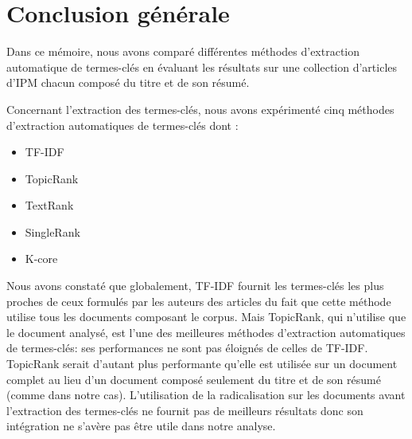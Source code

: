 \chapter*{Conclusion générale}

\qquad Dans ce mémoire, nous avons comparé différentes méthodes d'extraction automatique de termes-clés en évaluant les résultats sur une collection d'articles d'IPM chacun composé du titre et de son résumé.%

%

\smallskip

\qquad Concernant l'extraction des termes-clés, nous avons expérimenté cinq méthodes d'extraction automatiques de termes-clés dont : 
\begin{itemize}
	\item TF-IDF\cite{bougouin2013etat}
	\item TopicRank\cite{bougouin2013topicrank}
	\item TextRank\cite{mihalcea2004textrank}
	\item SingleRank\cite{wan2008single}
	\item K-core\cite{rousseau2015main}
\end{itemize}

\noindent Nous avons constaté que globalement, TF-IDF fournit les termes-clés les plus proches de ceux formulés par les auteurs des articles du fait que cette méthode  utilise tous les documents composant le corpus. Mais TopicRank, qui n'utilise que le document analysé, est l'une des meilleures méthodes d'extraction automatiques de termes-clés: ses performances ne sont pas éloignés de celles de TF-IDF. TopicRank serait d'autant plus performante qu'elle est utilisée sur un document complet au lieu d'un document composé seulement du titre et de son résumé (comme dans notre cas). L'utilisation de la radicalisation sur les documents avant l'extraction des termes-clés ne fournit pas de meilleurs résultats donc son intégration ne s'avère pas être utile dans notre analyse.

